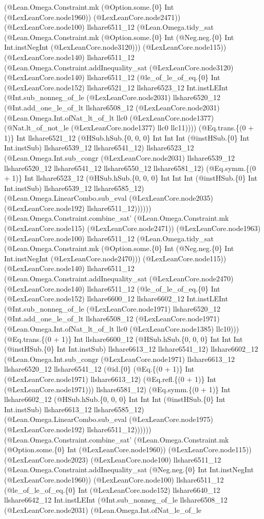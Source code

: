 \documentclass[11pt]{article}
\begin{document}
(@Lean.Omega.Constraint.mk (@Option.some.\{0\} Int (@LexLeanCore.node1960)) (@LexLeanCore.node2471)) (@LexLeanCore.node100) llshare6511\_12 (@Lean.Omega.tidy\_sat (@Lean.Omega.Constraint.mk (@Option.some.\{0\} Int (@Neg.neg.\{0\} Int Int.instNegInt (@LexLeanCore.node3120))) (@LexLeanCore.node115)) (@LexLeanCore.node140) llshare6511\_12 (@Lean.Omega.Constraint.addInequality\_sat (@LexLeanCore.node3120) (@LexLeanCore.node140) llshare6511\_12 (@le\_of\_le\_of\_eq.\{0\} Int (@LexLeanCore.node152) llshare6521\_12 llshare6523\_12 Int.instLEInt (@Int.sub\_nonneg\_of\_le (@LexLeanCore.node2031) llshare6520\_12 (@Int.add\_one\_le\_of\_lt llshare6508\_12 (@LexLeanCore.node2031) (@Lean.Omega.Int.ofNat\_lt\_of\_lt llc0 (@LexLeanCore.node1377) (@Nat.lt\_of\_not\_le (@LexLeanCore.node1377) llc0 llc11)))) (@Eq.trans.\{(0 + 1)\} Int llshare6521\_12 (@HSub.hSub.\{0, 0, 0\} Int Int Int (@instHSub.\{0\} Int Int.instSub) llshare6539\_12 llshare6541\_12) llshare6523\_12 (@Lean.Omega.Int.sub\_congr (@LexLeanCore.node2031) llshare6539\_12 llshare6520\_12 llshare6541\_12 llshare6550\_12 llshare6581\_12) (@Eq.symm.\{(0 + 1)\} Int llshare6523\_12 (@HSub.hSub.\{0, 0, 0\} Int Int Int (@instHSub.\{0\} Int Int.instSub) llshare6539\_12 llshare6585\_12) (@Lean.Omega.LinearCombo.sub\_eval (@LexLeanCore.node2035) (@LexLeanCore.node192) llshare6511\_12)))))) (@Lean.Omega.Constraint.combine\_sat' (@Lean.Omega.Constraint.mk (@LexLeanCore.node115) (@LexLeanCore.node2471)) (@LexLeanCore.node1963) (@LexLeanCore.node100) llshare6511\_12 (@Lean.Omega.tidy\_sat (@Lean.Omega.Constraint.mk (@Option.some.\{0\} Int (@Neg.neg.\{0\} Int Int.instNegInt (@LexLeanCore.node2470))) (@LexLeanCore.node115)) (@LexLeanCore.node140) llshare6511\_12 (@Lean.Omega.Constraint.addInequality\_sat (@LexLeanCore.node2470) (@LexLeanCore.node140) llshare6511\_12 (@le\_of\_le\_of\_eq.\{0\} Int (@LexLeanCore.node152) llshare6600\_12 llshare6602\_12 Int.instLEInt (@Int.sub\_nonneg\_of\_le (@LexLeanCore.node1971) llshare6520\_12 (@Int.add\_one\_le\_of\_lt llshare6508\_12 (@LexLeanCore.node1971) (@Lean.Omega.Int.ofNat\_lt\_of\_lt llc0 (@LexLeanCore.node1385) llc10))) (@Eq.trans.\{(0 + 1)\} Int llshare6600\_12 (@HSub.hSub.\{0, 0, 0\} Int Int Int (@instHSub.\{0\} Int Int.instSub) llshare6613\_12 llshare6541\_12) llshare6602\_12 (@Lean.Omega.Int.sub\_congr (@LexLeanCore.node1971) llshare6613\_12 llshare6520\_12 llshare6541\_12 (@id.\{0\} (@Eq.\{(0 + 1)\} Int (@LexLeanCore.node1971) llshare6613\_12) (@Eq.refl.\{(0 + 1)\} Int (@LexLeanCore.node1971))) llshare6581\_12) (@Eq.symm.\{(0 + 1)\} Int llshare6602\_12 (@HSub.hSub.\{0, 0, 0\} Int Int Int (@instHSub.\{0\} Int Int.instSub) llshare6613\_12 llshare6585\_12) (@Lean.Omega.LinearCombo.sub\_eval (@LexLeanCore.node1975) (@LexLeanCore.node192) llshare6511\_12)))))) (@Lean.Omega.Constraint.combine\_sat' (@Lean.Omega.Constraint.mk (@Option.some.\{0\} Int (@LexLeanCore.node1960)) (@LexLeanCore.node115)) (@LexLeanCore.node2023) (@LexLeanCore.node100) llshare6511\_12 (@Lean.Omega.Constraint.addInequality\_sat (@Neg.neg.\{0\} Int Int.instNegInt (@LexLeanCore.node1960)) (@LexLeanCore.node100) llshare6511\_12 (@le\_of\_le\_of\_eq.\{0\} Int (@LexLeanCore.node152) llshare6640\_12 llshare6642\_12 Int.instLEInt (@Int.sub\_nonneg\_of\_le llshare6508\_12 (@LexLeanCore.node2031) (@Lean.Omega.Int.ofNat\_le\_of\_le 
\end{document}

